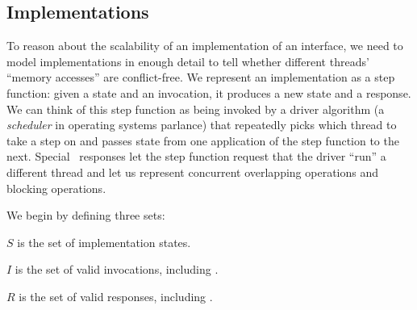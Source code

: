 

\subsection{Implementations}
\label{sec:rule:implementations}

To reason about the scalability of an implementation of an interface,
we need to model
implementations in enough detail to tell
whether different threads' ``memory accesses'' are conflict-free.
%
We represent an implementation as a step
function: given a state and an invocation, it produces a new state and a
response.
%
We can think of this step function as being invoked by a driver
algorithm (a \emph{scheduler} in operating systems parlance) that
repeatedly picks which thread to take a step on and passes state from
one application of the step
function to the next.
%
Special \YIELD\ responses let the step function request that the
driver ``run'' a different thread and let us represent
concurrent overlapping operations and blocking operations.

We begin by defining three sets:

\begin{CompactItemize}
\item $S$ is the set of implementation states.
\item $I$ is the set of valid invocations, including \CONTINUE.
\item $R$ is the set of valid responses, including \YIELD.
\end{CompactItemize}

